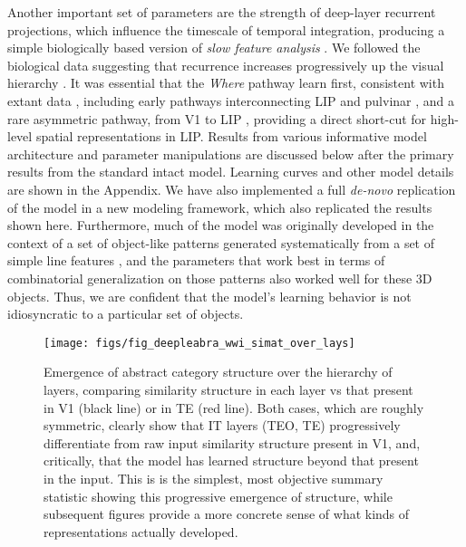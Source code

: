 \documentclass[11pt,twoside]{article}
\newif\myifpdf
\begin{document}
Another important set of parameters are the strength of deep-layer recurrent projections, which influence the timescale of temporal integration, producing a simple biologically based version of \emph{slow feature analysis} \citep{WiskottSejnowski02,Foldiak91}. We followed the biological data suggesting that recurrence increases progressively up the visual hierarchy \citep{ChaudhuriKnoblauchGarielEtAl15}.  It was essential that the \emph{Where} pathway learn first, consistent with extant data \citep{BourneRosa06,KiorpesPriceHall-HaroEtAl12}, including early pathways interconnecting LIP and pulvinar \citep{BridgeLeopoldBourne16}, and a rare asymmetric pathway, from V1 to LIP \citep{MarkovErcsey-RavaszGomesEtAl14}, providing a direct short-cut for high-level spatial representations in LIP.  Results from various informative model architecture and parameter manipulations are discussed below after the primary results from the standard intact model.  Learning curves and other model details are shown in the Appendix.  We have also implemented a full \emph{de-novo} replication of the model in a new modeling framework, which also replicated the results shown here.  Furthermore, much of the model was originally developed in the context of a set of object-like patterns generated systematically from a set of simple line features \cite{OReillyWyatteRohrlich17}, and the parameters that work best in terms of combinatorial generalization on those patterns also worked well for these 3D objects.  Thus, we are confident that the model's learning behavior is not idiosyncratic to a particular set of objects.

\begin{figure}
  \centering\texttt{[image: figs/fig\_deepleabra\_wwi\_simat\_over\_lays]}
  \caption{\footnotesize Emergence of abstract category structure over the hierarchy of layers, comparing similarity structure in each layer vs that present in V1 (black line) or in TE (red line).  Both cases, which are roughly symmetric, clearly show that IT layers (TEO, TE) progressively differentiate from raw input similarity structure present in V1, and, critically, that the model has learned structure beyond that present in the input.  This is is the simplest, most objective summary statistic showing this progressive emergence of structure, while subsequent figures provide a more concrete sense of what kinds of representations actually developed.}
  \label{fig.simat-lays}
\end{figure}
\end{document}
